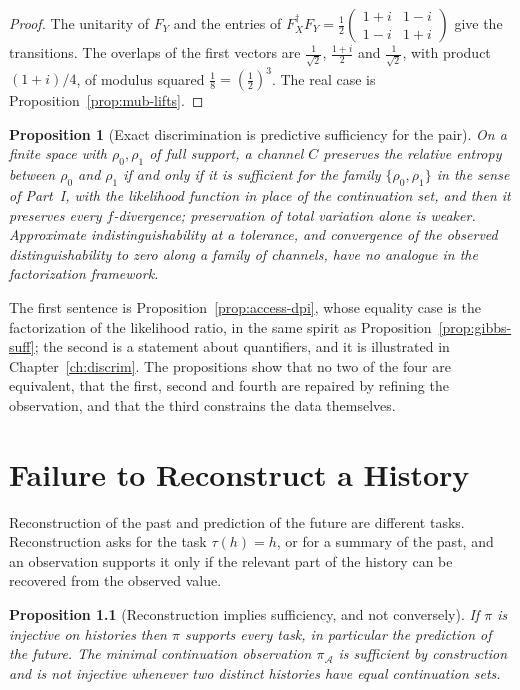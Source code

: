\documentclass[11pt,oneside]{book}
\newtheorem{proposition}[theorem]{Proposition}
\theoremstyle{definition}
\theoremstyle{remark}
\newcommand{\Adm}{\mathcal{A}}
\begin{document}
\begin{proof}
The unitarity of $F_Y$ and the entries of $F_X^\dagger F_Y=\tfrac12\begin{pmatrix}1+i&1-i\\1-i&1+i\end{pmatrix}$ give the transitions. The overlaps of the first vectors are $\tfrac1{\sqrt2}$, $\tfrac{1+i}2$ and $\tfrac1{\sqrt2}$, with product $(1+i)/4$, of modulus squared $\tfrac18=(\tfrac12)^3$. The real case is Proposition~\ref{prop:mub-lifts}.
\end{proof}

\begin{proposition}[Exact discrimination is predictive sufficiency for the pair]\label{prop:exact-disc}
On a finite space with $\rho_0,\rho_1$ of full support, a channel $C$ preserves the relative entropy between $\rho_0$ and $\rho_1$ if and only if it is sufficient for the family $\{\rho_0,\rho_1\}$ in the sense of Part~I, with the likelihood function in place of the continuation set, and then it preserves every $f$-divergence; preservation of total variation alone is weaker. Approximate indistinguishability at a tolerance, and convergence of the observed distinguishability to zero along a family of channels, have no analogue in the factorization framework.
\end{proposition}

The first sentence is Proposition~\ref{prop:access-dpi}, whose equality case is the factorization of the likelihood ratio, in the same spirit as Proposition~\ref{prop:gibbs-suff}; the second is a statement about quantifiers, and it is illustrated in Chapter~\ref{ch:discrim}. The propositions show that no two of the four are equivalent, that the first, second and fourth are repaired by refining the observation, and that the third constrains the data themselves.

\chapter{Failure to Reconstruct a History}\label{ch:recon}

Reconstruction of the past and prediction of the future are different tasks. Reconstruction asks for the task $\tau(h)=h$, or for a summary of the past, and an observation supports it only if the relevant part of the history can be recovered from the observed value.

\begin{proposition}[Reconstruction implies sufficiency, and not conversely]\label{prop:recon-pred}
If $\pi$ is injective on histories then $\pi$ supports every task, in particular the prediction of the future. The minimal continuation observation $\pi_\Adm$ is sufficient by construction and is not injective whenever two distinct histories have equal continuation sets.
\end{proposition}
\end{document}
